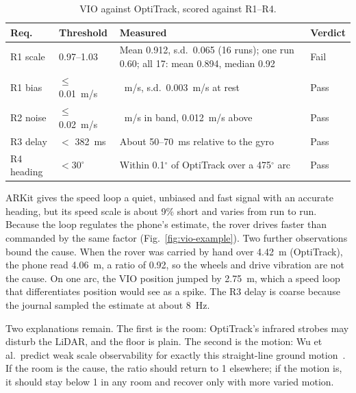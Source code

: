 \documentclass[conference]{IEEEtran}
\begin{document}
\begin{table}[t]
\centering
\caption{VIO against OptiTrack, scored against R1--R4.}
\label{tab:vio}
\footnotesize
\setlength{\tabcolsep}{3pt}
\begin{tabularx}{\columnwidth}{@{}l l >{\raggedright\arraybackslash}X l@{}}
\toprule
Req. & Threshold & Measured & Verdict \\
\midrule
R1 scale & 0.97--1.03 & Mean 0.912, s.d.\ 0.065 (16 runs); one run 0.60; all 17: mean 0.894, median 0.92 & Fail \\
R1 bias & $\le$ 0.01~m/s & 0.0009~m/s, s.d.\ 0.003~m/s at rest & Pass \\
R2 noise & $\le$ 0.02~m/s & 0.007~m/s in band, 0.012~m/s above & Pass \\
R3 delay & $<$ 382~ms & About 50--70~ms relative to the gyro & Pass \\
R4 heading & $< 30^\circ$ & Within 0.1$^\circ$ of OptiTrack over a 475$^\circ$ arc & Pass \\
\bottomrule
\end{tabularx}
\end{table}

ARKit gives the speed loop a quiet, unbiased and fast signal with an accurate heading, but its speed scale is about 9\% short and varies from run to run.
Because the loop regulates the phone's estimate, the rover drives faster than commanded by the same factor (Fig.~\ref{fig:vio-example}).
Two further observations bound the cause.
When the rover was carried by hand over 4.42~m (OptiTrack), the phone read 4.06~m, a ratio of 0.92, so the wheels and drive vibration are not the cause.
On one arc, the VIO position jumped by 2.75~m, which a speed loop that differentiates position would see as a spike.
The R3 delay is coarse because the journal sampled the estimate at about 8~Hz.

Two explanations remain.
The first is the room: OptiTrack's infrared strobes may disturb the LiDAR, and the floor is plain.
The second is the motion: Wu et al.\ predict weak scale observability for exactly this straight-line ground motion~\cite{wu2017vinswheels}.
If the room is the cause, the ratio should return to 1 elsewhere; if the motion is, it should stay below 1 in any room and recover only with more varied motion.
\end{document}
